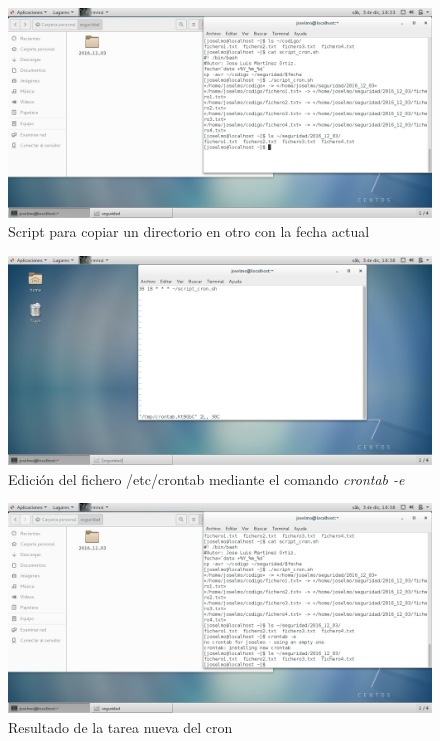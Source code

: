 \begin{figure}[H] %
\centering
\includegraphics[scale=0.4]{./imagenes/P3_2_1.png} 
\caption{Script para copiar un directorio en otro con la fecha actual} \label{fig:P3_2_1}
\end{figure}

\begin{figure}[H] %
\centering
\includegraphics[scale=0.4]{./imagenes/P3_2_3.png} 
\caption{Edición del fichero /etc/crontab mediante el comando \textit{crontab -e}} \label{fig:P3_2_3}
\end{figure}

\begin{figure}[H] %
\centering
\includegraphics[scale=0.4]{./imagenes/P3_2_2.png} 
\caption{Resultado de la tarea nueva del cron} \label{fig:P3_2_2}
\end{figure}

